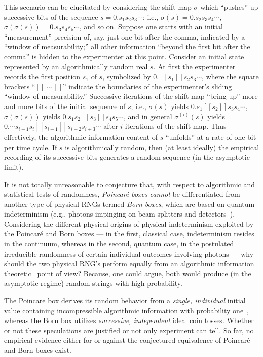 \documentclass[
aip,
cha,
amssymb
]{revtex4-1}
\begin{document}
This scenario can be elucitated by considering the shift map $\sigma$ which
``pushes'' up successive bits of the sequence $s=0.s_1s_2s_3\cdots$;
i.e., $\sigma (s)= 0.s_2s_3s_4\cdots$,  $\sigma (\sigma (s))= 0.s_3s_4s_5\cdots$, and so on.
Suppose one starts with an initial ``measurement'' precision of, say, just one bit after the comma,
indicated by a  ``window of measurability;''
all other information ``beyond the first bit after the comma'' is hidden to the experimenter at this point.
Consider an initial state represented by an algorithmically random real $s$.
At first the experimenter records the first position $s_1$ of $s$, symbolized by
$0.[[s_1]]s_2 s_3\cdots$, where the square brackets ``$[[~\cdots~]]$''
indicate the boundaries of the experimenter's sliding ``window of measurability.''
Successive iterations of the shift map ``bring up'' more and more bits of the initial sequence of $s$; i.e.,
$\sigma (s)$ yields $0.s_1[[s_2]]s_3s_4\cdots$,
$\sigma (\sigma (s))$ yields $0.s_1 s_2[[s_3]]s_4s_5\cdots$, and in general
$\sigma^{(i)} (s)$ yields $ 0.\cdots s_{i-1}s_{i}[[s_{i+1}]]s_{i+2}s_{i+3}\cdots$ after $i$ iterations of the shift map.
Thus effectively, the algorithmic information content of $s$ ``unfolds'' at a rate of one bit per time cycle.
If $s$ is algorithmically random, then (at least ideally) the empirical recording of its successive bits generates a random sequence (in the asymptotic limit).

It is not totally unreasonable to conjecture that, with respect to algorithmic and statistical tests of randomness,
{\em Poincar\'e boxes} {\em cannot} be differentiated from another type of physical RNGs termed {\em Born boxes}, which are based on quantum indeterminism
(e.g., photons impinging on beam splitters and detectors~\cite{svozil-qct,rarity-94,zeilinger:qct,stefanov-2000,0256-307X-21-10-027,wang:056107,fiorentino:032334,svozil-2009-howto}).
Considering the different physical origins of physical indeterminism exploited by the Poincar\'e and Born boxes
--- in the first, classical case, indeterminism resides in the continuum, whereas in the second, quantum case,
in the postulated~\cite{born-26-1,born-26-2,zeil-05_nature_ofQuantum,2008-cal-svo} irreducible randomness of certain individual outcomes involving photons ---
why should the two physical RNG's perform equally from an algorithmic information theoretic~\cite{chaitin3,calude:02} point of view?
Because, one could argue,
both would produce (in the asymptotic regime) random strings with high probability.

The Poincare box derives its random behavior from a {\em single, individual} initial value containing incompressible algorithmic information with probability
one~\cite{crutchfield1,brudno2},  whereas
the Born box utilizes {\em successive, independent} ideal coin tosses.
Whether or not these speculations are justified or not only experiment can tell.
So far, no empirical evidence either for or against the conjectured equivalence of Poincar\'e and Born boxes exist.
\end{document}
